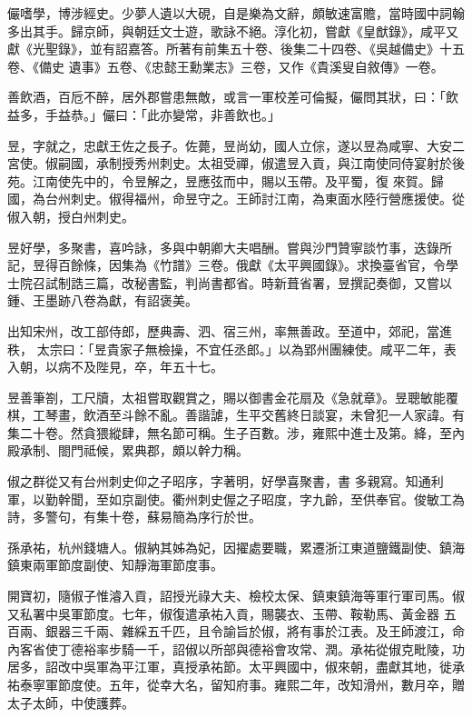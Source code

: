 \begin{pinyinscope}
 儼嗜學，博涉經史。少夢人遺以大硯，自是樂為文辭，頗敏速富贍，當時國中詞翰多出其手。歸京師，與朝廷文士遊，歌詠不絕。淳化初，嘗獻《皇猷錄》，咸平又獻《光聖錄》，並有詔嘉答。所著有前集五十卷、後集二十四卷、《吳越備史》十五卷、《備史
 遺事》五卷、《忠懿王勳業志》三卷，又作《貴溪叟自敘傳》一卷。



 善飲酒，百卮不醉，居外郡嘗患無敵，或言一軍校差可倫擬，儼問其狀，曰：「飲益多，手益恭。」儼曰：「此亦變常，非善飲也。」



 昱，字就之，忠獻王佐之長子。佐薨，昱尚幼，國人立倧，遂以昱為咸寧、大安二宮使。俶嗣國，承制授秀州刺史。太祖受禪，俶遣昱入貢，與江南使同侍宴射於後苑。江南使先中的，令昱解之，昱應弦而中，賜以玉帶。及平蜀，復
 來賀。歸國，為台州刺史。俶得福州，命昱守之。王師討江南，為東面水陸行營應援使。從俶入朝，授白州刺史。



 昱好學，多聚書，喜吟詠，多與中朝卿大夫唱酬。嘗與沙門贊寧談竹事，迭錄所記，昱得百餘條，因集為《竹譜》三卷。俄獻《太平興國錄》。求換臺省官，令學士院召試制誥三篇，改秘書監，判尚書都省。時新葺省署，昱撰記奏御，又嘗以鍾、王墨跡八卷為獻，有詔褒美。



 出知宋州，改工部侍郎，歷典壽、泗、宿三州，率無善政。至道中，郊祀，當進秩，
 太宗曰：「昱貴家子無檢操，不宜任丞郎。」以為郢州團練使。咸平二年，表入朝，以病不及陛見，卒，年五十七。



 昱善筆劄，工尺牘，太祖嘗取觀賞之，賜以御書金花扇及《急就章》。昱聰敏能覆棋，工琴畫，飲酒至斗餘不亂。善諧謔，生平交舊終日談宴，未曾犯一人家諱。有集二十卷。然貪猥縱肆，無名節可稱。生子百數。涉，雍熙中進士及第。絳，至內殿承制、閤門祗候，累典郡，頗以幹力稱。



 俶之群從又有台州刺史仰之子昭序，字著明，好學喜聚書，書
 多親寫。知通利軍，以勤幹聞，至如京副使。衢州刺史偓之子昭度，字九齡，至供奉官。俊敏工為詩，多警句，有集十卷，蘇易簡為序行於世。



 孫承祐，杭州錢塘人。俶納其姊為妃，因擢處要職，累遷浙江東道鹽鐵副使、鎮海鎮東兩軍節度副使、知靜海軍節度事。



 開寶初，隨俶子惟濬入貢，詔授光祿大夫、檢校太保、鎮東鎮海等軍行軍司馬。俶又私署中吳軍節度。七年，俶復遣承祐入貢，賜襲衣、玉帶、鞍勒馬、黃金器
 五百兩、銀器三千兩、雜綵五千匹，且令諭旨於俶，將有事於江表。及王師渡江，命內客省使丁德裕率步騎一千，詔俶以所部與德裕會攻常、潤。承祐從俶克毗陵，功居多，詔改中吳軍為平江軍，真授承祐節。太平興國中，俶來朝，盡獻其地，徙承祐泰寧軍節度使。五年，從幸大名，留知府事。雍熙二年，改知滑州，數月卒，贈太子太師，中使護葬。




\end{pinyinscope}
